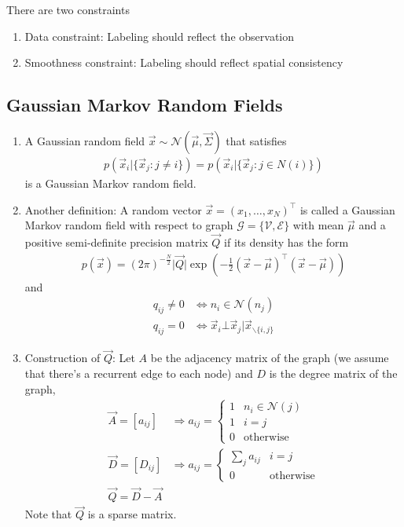 \documentclass[12pt,twoside]{article}
\begin{document}
There are two constraints
\begin{enumerate}
	\item Data constraint: Labeling should reflect the observation
	\item Smoothness constraint: Labeling should reflect spatial consistency
\end{enumerate}


\subsection{Gaussian Markov Random Fields}
\begin{enumerate}
	\item A Gaussian random field $\vec{x} \sim \mathcal{N}(\vec{\mu}, \vec{\Sigma})$ that satisfies
		\begin{align*}
			p(\vec{x}_i \vert \lbrace \vec{x}_j: j\neq i\rbrace) = p(\vec{x}_i \vert \lbrace \vec{x}_j: j \in N(i)\rbrace)
		\end{align*}
	is a Gaussian Markov random field.
	
	\item Another definition: A random vector $\vec{x} = (x_1, \ldots, x_N)^\top$ is called a Gaussian Markov random field with respect to graph $\mathcal{G} = \lbrace \mathcal{V}, \mathcal{E} \rbrace$ with mean $\vec{\mu}$ and a positive semi-definite precision matrix $\vec{Q}$ if its density has the form
		\begin{align*}
			p(\vec{x}) = (2\pi)^{-\frac{N}{2}} \vert \vec{Q} \vert \exp\left(-\frac{1}{2}(\vec{x}-\vec{\mu})^\top(\vec{x}-\vec{\mu})\right)
		\end{align*}
		and
		\begin{align*}
			q_{ij} \neq 0 &\Leftrightarrow n_i\in \mathcal{N}(n_j)\\
			q_{ij}  =0 &\Leftrightarrow \vec{x}_i\bot \vec{x}_j \vert \vec{x}_{\backslash \lbrace i,j \rbrace}
		\end{align*}

	\item Construction of $\vec{Q}$: Let  $A$ be the adjacency matrix of the graph (we assume that there's a recurrent edge to each node) and $D$ is the degree matrix of the graph,
		\begin{align*}
			\vec{A} = [a_{ij}] &\Rightarrow
			a_{ij}		 = \begin{cases}
			1		& 			n_i \in \mathcal{N}(j)\\
			1		&			i = j\\
			0		&			\text{otherwise}
			\end{cases}	\\
			\vec{D} = [D_{ij}] &\Rightarrow
			a_{ij}		 = \begin{cases}
			\sum_j a_{ij}		& 		i=j\\
			0		&			\text{otherwise}
			\end{cases}\\
			\vec{Q} = \vec{D} - \vec{A}		
		\end{align*}		
	Note that $\vec{Q}$ is a sparse matrix.
	

\end{enumerate}
\end{document}
